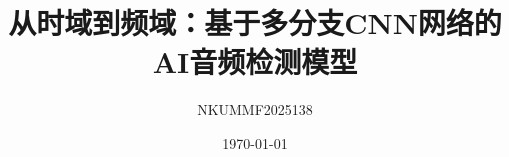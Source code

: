 \documentclass[aspectratio=169]{beamer}
\title{从时域到频域：基于多分支CNN网络的AI音频检测模型}
\author{NKUMMF2025138}
\date{\today}
\begin{document}
%
%
%
%
%
%
%


\begin{frame}
  \titlepage
\end{frame}

\end{document}
